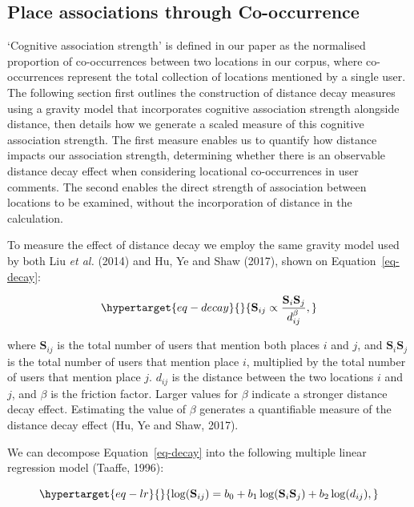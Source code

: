 \documentclass[
  letterpaper,
  11pt,
  english,
  onehalfspacing,
  headsepline]{MastersDoctoralThesis}
\begin{document}
\hypertarget{place-associations-through-co-occurrence}{%
\subsection{Place associations through
Co-occurrence}\label{place-associations-through-co-occurrence}}

`Cognitive association strength' is defined in our paper as the
normalised proportion of co-occurrences between two locations in our
corpus, where co-occurrences represent the total collection of locations
mentioned by a single user. The following section first outlines the
construction of distance decay measures using a gravity model that
incorporates cognitive association strength alongside distance, then
details how we generate a scaled measure of this cognitive association
strength. The first measure enables us to quantify how distance impacts
our association strength, determining whether there is an observable
distance decay effect when considering locational co-occurrences in user
comments. The second enables the direct strength of association between
locations to be examined, without the incorporation of distance in the
calculation.

To measure the effect of distance decay we employ the same gravity model
used by both Liu \emph{et al.} (2014) and Hu, Ye and Shaw (2017), shown
on Equation~\ref{eq-decay}:

\begin{equation}\protect\hypertarget{eq-decay}{}{
\mathbf{S}_{i j} \propto \frac{\mathbf{S}_{i} \mathbf{S}_{j}}{d_{i j}^{\beta}},
}\label{eq-decay}\end{equation}

where \(\mathbf{S}_{ij}\) is the total number of users that mention both
places \(i\) and \(j\), and \(\mathbf{S}_{i}\mathbf{S}_{j}\) is the
total number of users that mention place \(i\), multiplied by the total
number of users that mention place \(j\). \(d_{ij}\) is the distance
between the two locations \(i\) and \(j\), and \(\beta\) is the friction
factor. Larger values for \(\beta\) indicate a stronger distance decay
effect. Estimating the value of \(\beta\) generates a quantifiable
measure of the distance decay effect (Hu, Ye and Shaw, 2017).

We can decompose Equation~\ref{eq-decay} into the following multiple
linear regression model (Taaffe, 1996):

\begin{equation}\protect\hypertarget{eq-lr}{}{
\log(\mathbf{S}_{ij}) = b_{0} + b_{1}\log(\mathbf{S}_{i}\mathbf{S}_{j}) + b_{2}\log(d_{ij}),
}\label{eq-lr}\end{equation}
\end{document}
